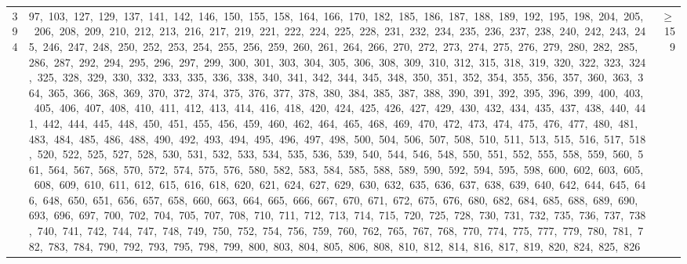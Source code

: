 \begin{longtable}{c|p{}|r}
394 & 97,\ 103,\ 127,\ 129,\ 137,\ 141,\ 142,\ 146,\ 150,\ 155,\ 158,\ 164,\ 166,\ 170,\ 182,\ 185,\ 186,\ 187,\ 188,\ 189,\ 192,\ 195,\ 198,\ 204,\ 205,\ 206,\ 208,\ 209,\ 210,\ 212,\ 213,\ 216,\ 217,\ 219,\ 221,\ 222,\ 224,\ 225,\ 228,\ 231,\ 232,\ 234,\ 235,\ 236,\ 237,\ 238,\ 240,\ 242,\ 243,\ 245,\ 246,\ 247,\ 248,\ 250,\ 252,\ 253,\ 254,\ 255,\ 256,\ 259,\ 260,\ 261,\ 264,\ 266,\ 270,\ 272,\ 273,\ 274,\ 275,\ 276,\ 279,\ 280,\ 282,\ 285,\ 286,\ 287,\ 292,\ 294,\ 295,\ 296,\ 297,\ 299,\ 300,\ 301,\ 303,\ 304,\ 305,\ 306,\ 308,\ 309,\ 310,\ 312,\ 315,\ 318,\ 319,\ 320,\ 322,\ 323,\ 324,\ 325,\ 328,\ 329,\ 330,\ 332,\ 333,\ 335,\ 336,\ 338,\ 340,\ 341,\ 342,\ 344,\ 345,\ 348,\ 350,\ 351,\ 352,\ 354,\ 355,\ 356,\ 357,\ 360,\ 363,\ 364,\ 365,\ 366,\ 368,\ 369,\ 370,\ 372,\ 374,\ 375,\ 376,\ 377,\ 378,\ 380,\ 384,\ 385,\ 387,\ 388,\ 390,\ 391,\ 392,\ 395,\ 396,\ 399,\ 400,\ 403,\ 405,\ 406,\ 407,\ 408,\ 410,\ 411,\ 412,\ 413,\ 414,\ 416,\ 418,\ 420,\ 424,\ 425,\ 426,\ 427,\ 429,\ 430,\ 432,\ 434,\ 435,\ 437,\ 438,\ 440,\ 441,\ 442,\ 444,\ 445,\ 448,\ 450,\ 451,\ 455,\ 456,\ 459,\ 460,\ 462,\ 464,\ 465,\ 468,\ 469,\ 470,\ 472,\ 473,\ 474,\ 475,\ 476,\ 477,\ 480,\ 481,\ 483,\ 484,\ 485,\ 486,\ 488,\ 490,\ 492,\ 493,\ 494,\ 495,\ 496,\ 497,\ 498,\ 500,\ 504,\ 506,\ 507,\ 508,\ 510,\ 511,\ 513,\ 515,\ 516,\ 517,\ 518,\ 520,\ 522,\ 525,\ 527,\ 528,\ 530,\ 531,\ 532,\ 533,\ 534,\ 535,\ 536,\ 539,\ 540,\ 544,\ 546,\ 548,\ 550,\ 551,\ 552,\ 555,\ 558,\ 559,\ 560,\ 561,\ 564,\ 567,\ 568,\ 570,\ 572,\ 574,\ 575,\ 576,\ 580,\ 582,\ 583,\ 584,\ 585,\ 588,\ 589,\ 590,\ 592,\ 594,\ 595,\ 598,\ 600,\ 602,\ 603,\ 605,\ 608,\ 609,\ 610,\ 611,\ 612,\ 615,\ 616,\ 618,\ 620,\ 621,\ 624,\ 627,\ 629,\ 630,\ 632,\ 635,\ 636,\ 637,\ 638,\ 639,\ 640,\ 642,\ 644,\ 645,\ 646,\ 648,\ 650,\ 651,\ 656,\ 657,\ 658,\ 660,\ 663,\ 664,\ 665,\ 666,\ 667,\ 670,\ 671,\ 672,\ 675,\ 676,\ 680,\ 682,\ 684,\ 685,\ 688,\ 689,\ 690,\ 693,\ 696,\ 697,\ 700,\ 702,\ 704,\ 705,\ 707,\ 708,\ 710,\ 711,\ 712,\ 713,\ 714,\ 715,\ 720,\ 725,\ 728,\ 730,\ 731,\ 732,\ 735,\ 736,\ 737,\ 738,\ 740,\ 741,\ 742,\ 744,\ 747,\ 748,\ 749,\ 750,\ 752,\ 754,\ 756,\ 759,\ 760,\ 762,\ 765,\ 767,\ 768,\ 770,\ 774,\ 775,\ 777,\ 779,\ 780,\ 781,\ 782,\ 783,\ 784,\ 790,\ 792,\ 793,\ 795,\ 798,\ 799,\ 800,\ 803,\ 804,\ 805,\ 806,\ 808,\ 810,\ 812,\ 814,\ 816,\ 817,\ 819,\ 820,\ 824,\ 825,\ 826 & $\ge$ 159 \\

\end{longtable}
